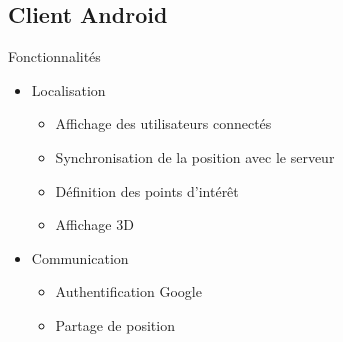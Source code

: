 \documentclass{beamer} %
\begin{document}
  \subsection{Client Android}
  \begin{frame}{\subsecname}
    \begin{block}{Fonctionnalités}
      \begin{itemize}
        \item Localisation
        \begin{itemize}
          \item Affichage des utilisateurs connectés
          \item Synchronisation de la position avec le serveur
          \item Définition des points d'intérêt
          \item Affichage 3D
        \end{itemize}

        \pause

        \item Communication
        \begin{itemize}
          \item Authentification Google
          \item Partage de position
        \end{itemize}
      \end{itemize}
    \end{block}
    
  \end{frame}
\end{document}

